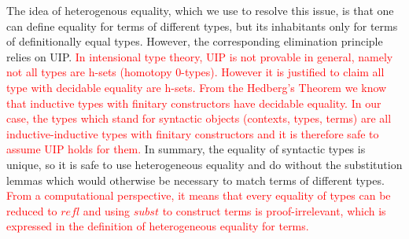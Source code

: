 \documentclass{acm_proc_article-sp}
\newcommand{\new}{\textcolor{red}}
\begin{document}
The idea of heterogenous equality, which we use to resolve this issue,
is that one can define equality for terms of different types, but its
inhabitants only for terms of definitionally equal types. However, the
corresponding elimination principle relies on UIP. \new{In intensional type theory, UIP is not provable in general,
  namely not all types are h-sets (homotopy 0-types). However it is
  justified to claim all type with decidable equality are h-sets.
  From the Hedberg's Theorem \cite{hed:98} we know that inductive
  types with finitary constructors have decidable equality. In our
  case, the types which stand for syntactic objects (contexts, types, terms)
  are all inductive-inductive types with finitary constructors and it is
  therefore safe to assume UIP holds for them. }
In summary, the equality of
syntactic types is unique, so it is safe to use heterogeneous equality
and do without the substitution lemmas which would otherwise be
necessary to match terms of different types. \new{From a computational perspective, it means that every equality of types can be reduced to $\mathit{refl}$ and using $\mathit{subst}$ to construct terms is proof-irrelevant, which is expressed in the definition of heterogeneous equality for terms. }


\begin{code}\>\<%
\\
\>  \AgdaSymbol{\{} \AgdaSymbol{:} \AgdaSymbol{\}\{} \AgdaSymbol{:}  \AgdaSymbol{\}} \AgdaSymbol{:}\<%
\\
\>[2]\<[9]%
\>[9]\AgdaSymbol{\{} \AgdaSymbol{:}  \AgdaSymbol{\}}         \<%
\\
\>[0]\<[2]%
\>[2] \AgdaSymbol{:} \AgdaSymbol{(} \AgdaSymbol{:}  \AgdaSymbol{)}    \<%
\\
\>\<\end{code}
\end{document}
